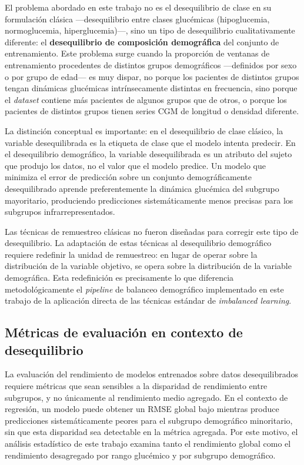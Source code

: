 El problema abordado en este trabajo no es el desequilibrio de clase en su formulación clásica —desequilibrio entre clases glucémicas (hipoglucemia, normoglucemia, hiperglucemia)—, sino un tipo de desequilibrio cualitativamente diferente: el \textbf{desequilibrio de composición demográfica} del conjunto de entrenamiento. Este problema surge cuando la proporción de ventanas de entrenamiento procedentes de distintos grupos demográficos —definidos por sexo o por grupo de edad— es muy dispar, no porque los pacientes de distintos grupos tengan dinámicas glucémicas intrínsecamente distintas en frecuencia, sino porque el \emph{dataset} contiene más pacientes de algunos grupos que de otros, o porque los pacientes de distintos grupos tienen series CGM de longitud o densidad diferente.

La distinción conceptual es importante: en el desequilibrio de clase clásico, la variable desequilibrada es la etiqueta de clase que el modelo intenta predecir. En el desequilibrio demográfico, la variable desequilibrada es un atributo del sujeto que produjo los datos, no el valor que el modelo predice. Un modelo que minimiza el error de predicción sobre un conjunto demográficamente desequilibrado aprende preferentemente la dinámica glucémica del subgrupo mayoritario, produciendo predicciones sistemáticamente menos precisas para los subgrupos infrarrepresentados.

Las técnicas de remuestreo clásicas no fueron diseñadas para corregir este tipo de desequilibrio. La adaptación de estas técnicas al desequilibrio demográfico requiere redefinir la unidad de remuestreo: en lugar de operar sobre la distribución de la variable objetivo, se opera sobre la distribución de la variable demográfica. Esta redefinición es precisamente lo que diferencia metodológicamente el \emph{pipeline} de balanceo demográfico implementado en este trabajo de la aplicación directa de las técnicas estándar de \emph{imbalanced learning}.

\subsection{Métricas de evaluación en contexto de desequilibrio}
\label{subsec:metricas_imbalanced}

La evaluación del rendimiento de modelos entrenados sobre datos desequilibrados requiere métricas que sean sensibles a la disparidad de rendimiento entre subgrupos, y no únicamente al rendimiento medio agregado. En el contexto de regresión, un modelo puede obtener un RMSE global bajo mientras produce predicciones sistemáticamente peores para el subgrupo demográfico minoritario, sin que esta disparidad sea detectable en la métrica agregada. Por este motivo, el análisis estadístico de este trabajo examina tanto el rendimiento global como el rendimiento desagregado por rango glucémico y por subgrupo demográfico.


